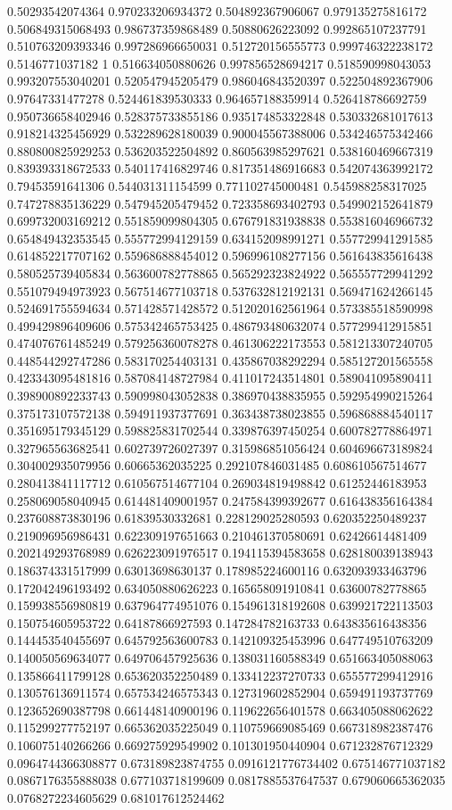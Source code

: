 \begin{table}
\begin{tabu}
\begin{sparkline}{10}
0.50293542074364 0.970233206934372 0.504892367906067 0.979135275816172 0.506849315068493 0.986737359868489 0.50880626223092 0.992865107237791 0.510763209393346 0.997286966650031 0.512720156555773 0.999746322238172 0.5146771037182 1 0.516634050880626 0.997856528694217 0.518590998043053 0.993207553040201 0.520547945205479 0.986046843520397 0.522504892367906 0.97647331477278 0.524461839530333 0.964657188359914 0.526418786692759 0.950736658402946 0.528375733855186 0.935174853322848 0.530332681017613 0.918214325456929 0.532289628180039 0.900045567388006 0.534246575342466 0.880800825929253 0.536203522504892 0.860563985297621 0.538160469667319 0.839393318672533 0.540117416829746 0.817351486916683 0.542074363992172 0.79453591641306 0.544031311154599 0.771102745000481 0.545988258317025 0.747278835136229 0.547945205479452 0.723358693402793 0.549902152641879 0.699732003169212 0.551859099804305 0.676791831938838 0.553816046966732 0.654849432353545 0.555772994129159 0.634152098991271 0.557729941291585 0.614852217707162 0.559686888454012 0.596996108277156 0.561643835616438 0.580525739405834 0.563600782778865 0.565292323824922 0.565557729941292 0.551079494973923 0.567514677103718 0.537632812192131 0.569471624266145 0.524691755594634 0.571428571428572 0.512020162561964 0.573385518590998 0.499429896409606 0.575342465753425 0.486793480632074 0.577299412915851 0.474076761485249 0.579256360078278 0.461306222173553 0.581213307240705 0.448544292747286 0.583170254403131 0.435867038292294 0.585127201565558 0.423343095481816 0.587084148727984 0.411017243514801 0.589041095890411 0.398900892233743 0.590998043052838 0.386970438835955 0.592954990215264 0.375173107572138 0.594911937377691 0.363438738023855 0.596868884540117 0.351695179345129 0.598825831702544 0.339876397450254 0.600782778864971 0.327965563682541 0.602739726027397 0.315986851056424 0.604696673189824 0.304002935079956 0.60665362035225 0.292107846031485 0.608610567514677 0.280413841117712 0.610567514677104 0.269034819498842 0.61252446183953 0.258069058040945 0.614481409001957 0.247584399392677 0.616438356164384 0.237608873830196 0.61839530332681 0.228129025280593 0.620352250489237 0.219096956986431 0.622309197651663 0.210461370580691 0.62426614481409 0.202149293768989 0.626223091976517 0.194115394583658 0.628180039138943 0.186374331517999 0.63013698630137 0.178985224600116 0.632093933463796 0.172042496193492 0.634050880626223 0.165658091910841 0.63600782778865 0.159938556980819 0.637964774951076 0.154961318192608 0.639921722113503 0.150754605953722 0.64187866927593 0.147284782163733 0.643835616438356 0.144453540455697 0.645792563600783 0.142109325453996 0.647749510763209 0.140050569634077 0.649706457925636 0.138031160588349 0.651663405088063 0.135866411799128 0.653620352250489 0.133412237270733 0.655577299412916 0.130576136911574 0.657534246575343 0.127319602852904 0.659491193737769 0.123652690387798 0.661448140900196 0.119622656401578 0.663405088062622 0.115299277752197 0.665362035225049 0.110759669085469 0.667318982387476 0.106075140266266 0.669275929549902 0.101301950440904 0.671232876712329 0.0964744366308877 0.673189823874755 0.0916121776734402 0.675146771037182 0.0867176355888038 0.677103718199609 0.0817885537647537 0.679060665362035 0.0768272234605629 0.681017612524462 
\end{sparkline}
\end{tabu}
\end{table}

